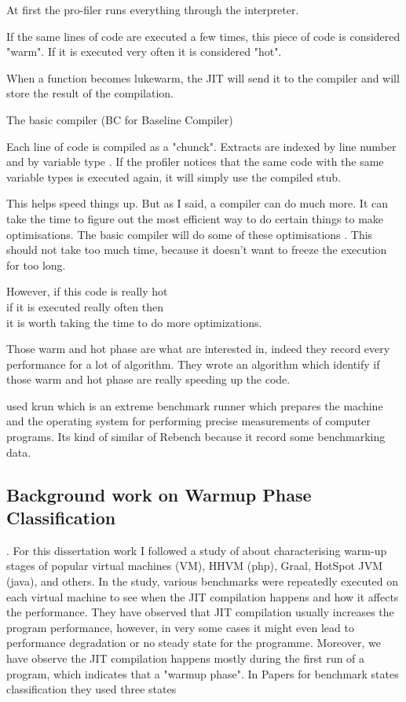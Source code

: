\documentclass{article}
\begin{document}
At first the pro-filer runs everything through the interpreter.

If the same lines of code are executed a few times, this piece of code is considered "warm". If it is executed very often it is considered "hot".

When a function becomes lukewarm, the JIT will send it to the compiler and will store the result of the compilation.

The basic compiler (BC for Baseline Compiler)

Each line of code is compiled as a "chunck". Extracts are indexed by line number and by variable type . If the profiler notices that the same code with the same variable types is executed again, it will simply use the compiled stub.

This helps speed things up. But as I said, a compiler can do much more. It can take the time to figure out the most efficient way to do certain things to make optimisations. The basic compiler will do some of these optimisations . This should not take too much time, because it doesn't want to freeze the execution for too long.

However, if this code is really hot \\ 
if it is executed really often then \\
it is worth taking the time to do more optimizations.

Those warm and hot phase are what \cite{barrett2017virtual} are interested in, indeed they record every performance for a lot of algorithm. They wrote an algorithm which identify if those warm and hot phase are really speeding up the code.

\cite{barrett2017virtual} used krun which is an extreme benchmark runner which prepares the machine and the operating system for performing precise measurements of computer programs. Its kind of similar of Rebench because it record some benchmarking data.

\subsection{Background work on Warmup Phase Classification}

.
For this dissertation work I followed a study of \cite{barrett2017virtual} about characterising warm-up stages of popular virtual machines (VM), HHVM (php), Graal, HotSpot JVM (java), and others. 
In the study, various benchmarks were repeatedly executed on each virtual machine to see when the JIT compilation happens and how it affects the performance.
They have observed that JIT compilation usually increases the program performance, however, in very some cases it might even lead to performance degradation or no steady state for the programme. Moreover, we have observe the JIT compilation happens mostly during the first run of a program, which indicates that a "warmup phase".
In \cite{barrett2017virtual} Papers for benchmark states classification they used three states 
\end{document}
